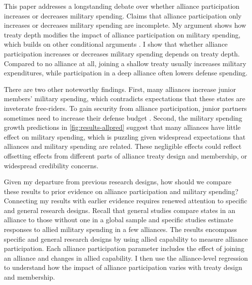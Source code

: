\documentclass[12pt]{article}
\begin{document}
This paper addresses a longstanding debate over whether alliance participation increases or decreases military spending. 
Claims that alliance participation only increases or decreases military spending are incomplete. 
My argument shows how treaty depth modifies the impact of alliance participation on military spending, which builds on other conditional arguments \citep{DigiuseppePoast2016}. 
I show that whether alliance participation increases or decreases military spending depends on treaty depth. 
Compared to no alliance at all, joining a shallow treaty usually increases military expenditures, while participation in a deep alliance often lowers defense spending. 


There are two other noteworthy findings.  
First, many alliances increase junior members' military spending, which contradicts expectations that these states are inveterate free-riders. 
To gain security from alliance participation, junior partners sometimes need to increase their defense budget \citep{Horowitzetal2017}. 
Second, the military spending growth predictions in \autoref{fig:results-allpred} suggest that many alliances have little effect on military spending, which is puzzling given widespread expectations that alliances and military spending are related. 
These negligible effects could reflect offsetting effects from different parts of alliance treaty design and membership, or widespread credibility concerns. 


Given my departure from previous research designs, how should we compare these results to prior evidence on alliance participation and military spending? 
Connecting my results with earlier evidence requires renewed attention to specific and general research designs. 
Recall that general studies compare states in an alliance to those without one in a global sample and specific studies estimate responses to allied military spending in a few alliances. 
The results encompass specific and general research designs by using allied capability to measure alliance participation. 
Each alliance participation parameter includes the effect of joining an alliance and changes in allied capability. 
I then use the alliance-level regression to understand how the impact of alliance participation varies with treaty design and membership.   
\end{document}
